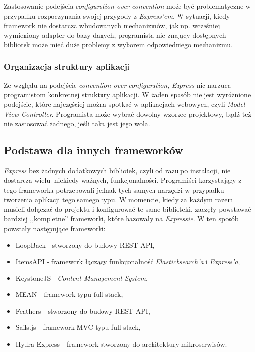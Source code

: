Zastosowanie podejścia \textit{configuration over convention} może być problematyczne w przypadku rozpoczynania swojej przygody z \textit{Express'em}. W sytuacji, kiedy framework nie dostarcza wbudowanych mechanizmów, jak np. wcześniej wymieniony adapter do bazy danych, programista nie znający dostępnych bibliotek może mieć duże problemy z wyborem odpowiedniego mechanizmu.

\subsubsection{Organizacja struktury aplikacji}
Ze względu na podejście \textit{convention over configuration}, \textit{Express} nie narzuca programistom konkretnej struktury aplikacji. W żaden sposób nie jest wyróżnione podejście, które najczęściej można spotkać w aplikacjach webowych, czyli \textit{Model-View-Controller}. Programista może wybrać dowolny wzorzec projektowy, bądź też nie zastosować żadnego, jeśli taka jest jego wola.

\subsection{Podstawa dla innych frameworków}
\textit{Express} bez żadnych dodatkowych bibliotek, czyli od razu po instalacji, nie dostarcza wielu, niekiedy ważnych, funkcjonalności. Programiści korzystający z tego frameworka potrzebowali jednak tych samych narzędzi w przypadku tworzenia aplikacji tego samego typu. W momencie, kiedy za każdym razem musieli dołączać do projektu i konfigurować te same biblioteki, zaczęły powstawać bardziej ,,kompletne'' frameworki, które bazowały na \textit{Expressie}. W ten sposób powstały następujące frameworki:
\begin{itemize}
  \item LoopBack - stworzony do budowy REST API,
  \item ItemsAPI - framework łączący funkcjonalność \textit{Elastichsearch'a} i \textit{Express'a},
  \item KeystoneJS - \textit{Content Management System},
  \item MEAN - framework typu full-stack,
  \item Feathers - stworzony do budowy REST API,
  \item Sails.js - framework MVC typu full-stack,
  \item Hydra-Express - framework stworzony do architektury mikroserwisów.
\end{itemize}


